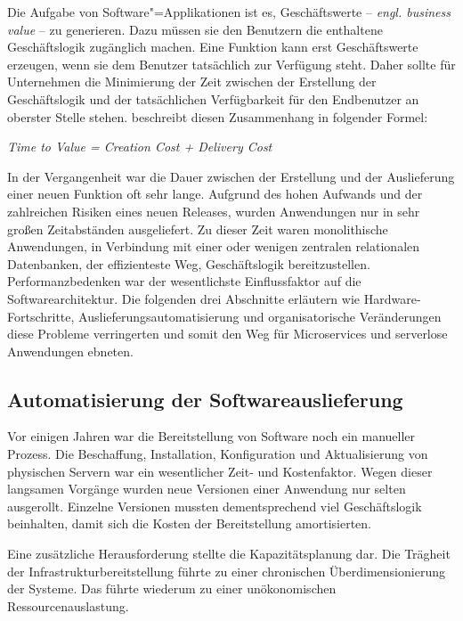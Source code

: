 Die Aufgabe von Software"=Applikationen ist es, Geschäftswerte -- \textit{engl. business value} -- zu generieren. Dazu müssen sie den Benutzern die enthaltene Geschäftslogik zugänglich machen. Eine Funktion kann erst Geschäftswerte erzeugen, wenn sie dem Benutzer tatsächlich zur Verfügung steht. Daher sollte für Unternehmen die Minimierung der Zeit zwischen der Erstellung der Geschäftslogik und der tatsächlichen Verfügbarkeit für den Endbenutzer an oberster Stelle stehen. \citeauthor{Cock16EvoFunc} beschreibt diesen Zusammenhang in folgender Formel:

\begin{center}
\textit{Time to Value = Creation Cost + Delivery Cost}
\end{center}

In der Vergangenheit war die Dauer zwischen der Erstellung und der Auslieferung einer neuen Funktion oft sehr lange. Aufgrund des hohen Aufwands und der zahlreichen Risiken eines neuen Releases, wurden Anwendungen nur in sehr großen Zeitabständen ausgeliefert. Zu dieser Zeit waren monolithische Anwendungen, in Verbindung mit einer oder wenigen zentralen relationalen Datenbanken, der effizienteste Weg, Geschäftslogik bereitzustellen. Performanzbedenken war der wesentlichste Einflussfaktor auf die Softwarearchitektur. Die folgenden drei Abschnitte erläutern wie Hardware-Fortschritte, Auslieferungsautomatisierung und organisatorische Veränderungen diese Probleme verringerten und somit den Weg für Microservices und serverlose Anwendungen ebneten.

\subsection{Automatisierung der Softwareauslieferung}

Vor einigen Jahren war die Bereitstellung von Software noch ein manueller Prozess. Die Beschaffung, Installation, Konfiguration und Aktualisierung von physischen Servern war ein wesentlicher Zeit- und Kostenfaktor. Wegen dieser langsamen Vorgänge wurden neue Versionen einer Anwendung nur selten ausgerollt. Einzelne Versionen mussten dementsprechend viel Geschäftslogik beinhalten, damit sich die Kosten der Bereitstellung amortisierten.

Eine zusätzliche Herausforderung stellte die Kapazitätsplanung dar. Die Trägheit der Infrastrukturbereitstellung führte zu einer chronischen Überdimensionierung der Systeme. Das führte wiederum zu einer unökonomischen Ressourcenauslastung.

